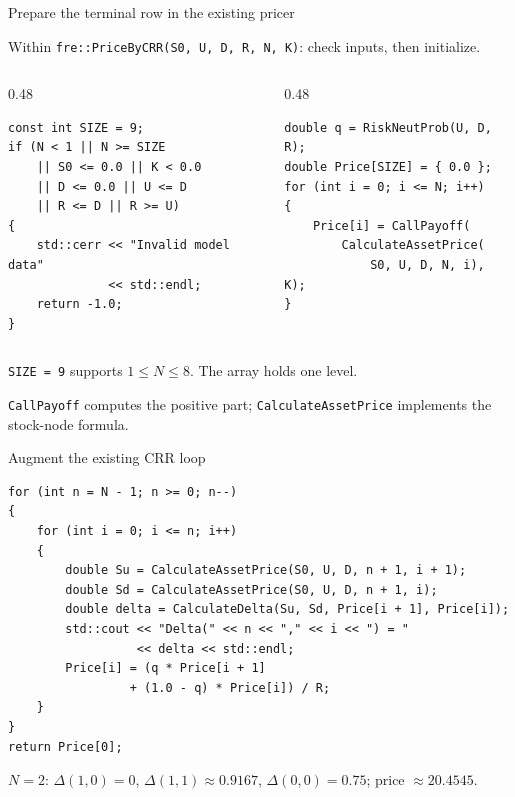 \documentclass[10pt,aspectratio=169]{beamer}
\begin{document}
\begin{frame}[fragile]{Prepare the terminal row in the existing pricer}
\relax

{\small Within \texttt{fre::PriceByCRR(S0, U, D, R, N, K)}: check inputs, then initialize.}
\begin{columns}[T,onlytextwidth]
\begin{column}{0.48\textwidth}
\begin{lstlisting}[basicstyle=\ttfamily\fontsize{8.5}{10}\selectfont]
const int SIZE = 9;
if (N < 1 || N >= SIZE
    || S0 <= 0.0 || K < 0.0
    || D <= 0.0 || U <= D
    || R <= D || R >= U)
{
    std::cerr << "Invalid model data"
              << std::endl;
    return -1.0;
}
\end{lstlisting}
\end{column}
\begin{column}{0.48\textwidth}
\begin{lstlisting}[basicstyle=\ttfamily\fontsize{8.5}{10}\selectfont]
double q = RiskNeutProb(U, D, R);
double Price[SIZE] = { 0.0 };
for (int i = 0; i <= N; i++)
{
    Price[i] = CallPayoff(
        CalculateAssetPrice(
            S0, U, D, N, i), K);
}
\end{lstlisting}
\end{column}
\end{columns}
\medskip
\texttt{SIZE = 9} supports $1\leq N\leq8$. The array holds one level.\par
{\small \texttt{CallPayoff} computes the positive part; \texttt{CalculateAssetPrice} implements the stock-node formula.}
\end{frame}

\begin{frame}[fragile]{Augment the existing CRR loop}
\relax

\begin{lstlisting}[basicstyle=\ttfamily\fontsize{8.5}{10}\selectfont]
for (int n = N - 1; n >= 0; n--)
{
    for (int i = 0; i <= n; i++)
    {
        double Su = CalculateAssetPrice(S0, U, D, n + 1, i + 1);
        double Sd = CalculateAssetPrice(S0, U, D, n + 1, i);
        double delta = CalculateDelta(Su, Sd, Price[i + 1], Price[i]);
        std::cout << "Delta(" << n << "," << i << ") = "
                  << delta << std::endl;
        Price[i] = (q * Price[i + 1]
                 + (1.0 - q) * Price[i]) / R;
    }
}
return Price[0];
\end{lstlisting}
{\small $N=2$: $\Delta(1,0)=0$, $\Delta(1,1)\approx0.9167$, $\Delta(0,0)=0.75$; price $\approx20.4545$.}

\end{frame}
\end{document}
